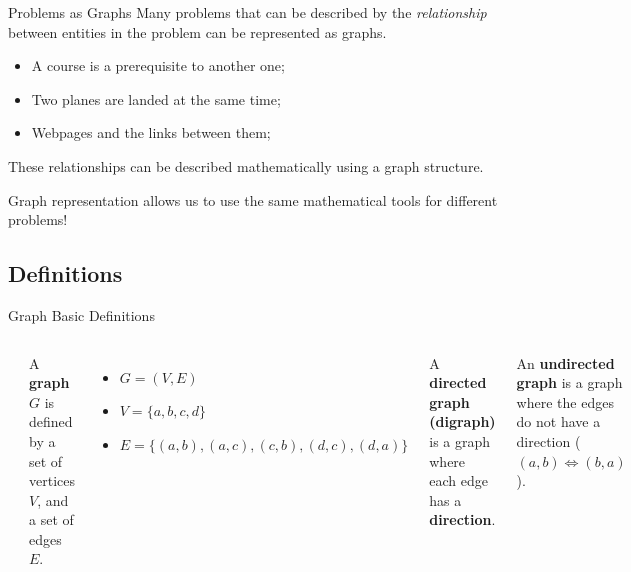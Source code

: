 \begin{frame}[t]{Problems as Graphs}
  Many problems that can be described by the \emph{relationship} between entities in the problem can be represented as graphs.\bigskip

  \begin{itemize}
    \item A course is a prerequisite to another one;
    \item Two planes are landed at the same time;
    \item Webpages and the links between them;
  \end{itemize}\bigskip

  These relationships can be described mathematically using a graph structure.

  \vfill 

  \begin{block}{}
  Graph representation allows us to use the same mathematical tools for different problems!
  \end{block}
\end{frame}

\subsection{Definitions}

\begin{frame}[t]{Graph Basic Definitions}

    \begin{columns}
      \begin{center}
        
      \end{center}

        A {\bf graph} $G$ is defined by a set of vertices $V$, and a set of edges $E$.\bigskip

        \begin{itemize}
          \item $G = (V,E)$
          \item $V = \{a,b,c,d\}$
          \item $E = \{(a,b), (a,c), (c,b), (d,c), (d,a)\}$
        \end{itemize}\bigskip

         A {\bf directed graph (digraph)} is a graph where each edge has a {\bf direction}.\medskip

         An {\bf undirected graph} is a graph where the edges do not have a direction ($(a,b) \iff (b,a)$).
    \end{columns}
\end{frame}

